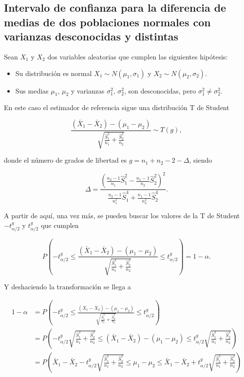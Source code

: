 \documentclass[
  spanish,
  a4paper,
]{scrreport}
\providecommand{\tightlist}{%
  \setlength{\itemsep}{0pt}\setlength{\parskip}{0pt}}
\theoremstyle{plain}
\theoremstyle{definition}
\theoremstyle{definition}
\theoremstyle{remark}
\begin{document}
\subsection{Intervalo de confianza para la diferencia de medias de dos
poblaciones normales con varianzas desconocidas y
distintas}\label{intervalo-de-confianza-para-la-diferencia-de-medias-de-dos-poblaciones-normales-con-varianzas-desconocidas-y-distintas}

Sean \(X_1\) y \(X_2\) dos variables aleatorias que cumplen las
siguientes hipótesis:

\begin{itemize}
\tightlist
\item
  Su distribución es normal \(X_1\sim N(\mu_1,\sigma_1)\) y
  \(X_2\sim N(\mu_2,\sigma_2)\).
\item
  Sus medias \(\mu_1\), \(\mu_2\) y varianzas \(\sigma_1^2\),
  \(\sigma_2^2\), son desconocidas, pero \(\sigma^2_1\neq \sigma^2_2\).
\end{itemize}

En este caso el estimador de referencia sigue una distribución T de
Student

\[
\frac{(\bar{X}_1-\bar{X}_2)-(\mu_1-\mu_2)}{\sqrt{\frac{\hat{S}^2_1}{n_1}+\frac{\hat{S}^2_2}{n_2}}} \sim T(g),
\]

donde el número de grados de libertad es \(g=n_1+n_2-2-\Delta\), siendo

\[
\Delta =
\frac{(\frac{n_2-1}{n_1}\hat{S}_1^2-\frac{n_1-1}{n_2}\hat{S}_2^2)^2}{\frac{n_2-1}{n_1^2}\hat{S}_1^4+\frac{n_1-1}{n_2^2}\hat{S}_2^4}.
\]

A partir de aquí, una vez más, se pueden buscar los valores de la T de
Student \(-t^{g}_{\alpha/2}\) y \(t^{g}_{\alpha/2}\) que cumplen

\[
P\left(-t^{g}_{\alpha/2}\leq \frac{(\bar{X}_1-\bar{X}_2)-(\mu_1-\mu_2)}{\sqrt{\frac{\hat{S}^2_1}{n_1}+\frac{\hat{S}^2_2}{n_2}}} \leq t^{g}_{\alpha/2}\right) = 1-\alpha.
\]

Y deshaciendo la transformación se llega a

\begin{align*}
1-\alpha 
&= P\left(-t^{g}_{\alpha/2}\leq \frac{(\bar{X}_1-\bar{X}_2)-(\mu_1-\mu_2)}{\sqrt{\frac{\hat{S}^2_1}{n_1}+\frac{\hat{S}^2_2}{n_2}}} \leq t^{g}_{\alpha/2}\right) \\
&= P\left(-t^{g}_{\alpha/2}\sqrt{\frac{\hat{S}^2_1}{n_1}+\frac{\hat{S}^2_2}{n_2}}\leq (\bar{X}_1-\bar{X}_2)-(\mu_1-\mu_2) \leq t^{g}_{\alpha/2}\sqrt{\frac{\hat{S}^2_1}{n_1}+\frac{\hat{S}^2_2}{n_2}}\right) \\
&= P\left(\bar{X}_1-\bar{X}_2 - t^{g}_{\alpha/2}\sqrt{\frac{\hat{S}^2_1}{n_1}+\frac{\hat{S}^2_2}{n_2}}\leq\mu_1-\mu_2 \leq \bar{X}_1-\bar{X}_2 + t^{g}_{\alpha/2}\sqrt{\frac{\hat{S}^2_1}{n_1}+\frac{\hat{S}^2_2}{n_2}}\right) \\
\end{align*}
\end{document}
